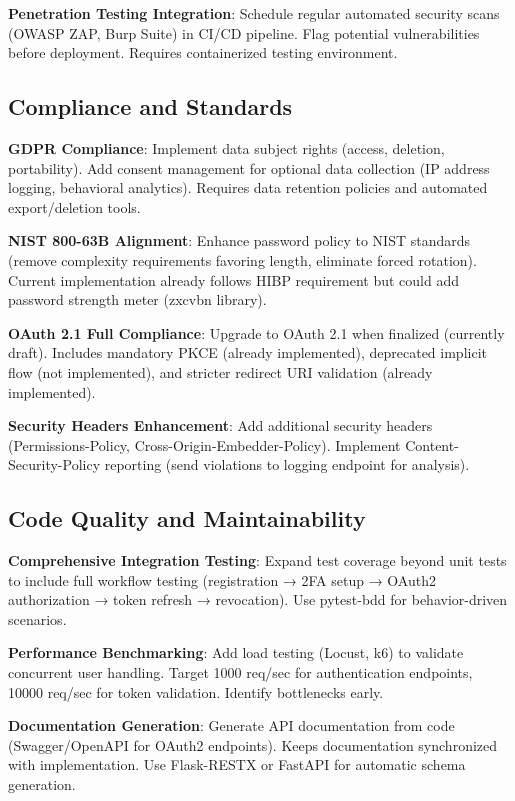 \documentclass[12pt,a4paper]{article}
\begin{document}
\textbf{Penetration Testing Integration}: Schedule regular automated security scans (OWASP ZAP, Burp Suite) in CI/CD pipeline. Flag potential vulnerabilities before deployment. Requires containerized testing environment.

\subsection{Compliance and Standards}

\textbf{GDPR Compliance}: Implement data subject rights (access, deletion, portability). Add consent management for optional data collection (IP address logging, behavioral analytics). Requires data retention policies and automated export/deletion tools.

\textbf{NIST 800-63B Alignment}: Enhance password policy to NIST standards (remove complexity requirements favoring length, eliminate forced rotation). Current implementation already follows HIBP requirement but could add password strength meter (zxcvbn library).

\textbf{OAuth 2.1 Full Compliance}: Upgrade to OAuth 2.1 when finalized (currently draft). Includes mandatory PKCE (already implemented), deprecated implicit flow (not implemented), and stricter redirect URI validation (already implemented).

\textbf{Security Headers Enhancement}: Add additional security headers (Permissions-Policy, Cross-Origin-Embedder-Policy). Implement Content-Security-Policy reporting (send violations to logging endpoint for analysis).

\subsection{Code Quality and Maintainability}

\textbf{Comprehensive Integration Testing}: Expand test coverage beyond unit tests to include full workflow testing (registration → 2FA setup → OAuth2 authorization → token refresh → revocation). Use pytest-bdd for behavior-driven scenarios.

\textbf{Performance Benchmarking}: Add load testing (Locust, k6) to validate concurrent user handling. Target 1000 req/sec for authentication endpoints, 10000 req/sec for token validation. Identify bottlenecks early.

\textbf{Documentation Generation}: Generate API documentation from code (Swagger/OpenAPI for OAuth2 endpoints). Keeps documentation synchronized with implementation. Use Flask-RESTX or FastAPI for automatic schema generation.
\end{document}
